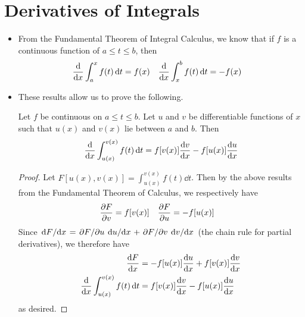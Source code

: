 \documentclass[../main.tex]{subfiles}
\begin{document}
\section{Derivatives of Integrals}
\begin{itemize}
    \item From the Fundamental Theorem of Integral Calculus, we know that if $f$ is a continuous function of $a\leq t\leq b$, then
    \begin{align*}
        \dv{x}\int_a^xf(t)\dd{t} &= f(x)&
            \dv{x}\int_x^bf(t)\dd{t} &= -f(x)
    \end{align*}
    \item These results allow us to prove the following.
    \begin{thm}
        Let $f$ be continuous on $a\leq t\leq b$. Let $u$ and $v$ be differentiable functions of $x$ such that $u(x)$ and $v(x)$ lie between $a$ and $b$. Then
        \begin{equation*}
            \dv{x}\int_{u(x)}^{v(x)}f(t)\dd{t} = f[v(x)]\dv{v}{x}-f[u(x)]\dv{u}{x}
        \end{equation*}
        \begin{proof}
            Let $F[u(x),v(x)]=\int_{u(x)}^{v(x)}f(t)\dd{t}$. Then by the above results from the Fundamental Theorem of Calculus, we respectively have
            \begin{align*}
                \pdv{F}{v} &= f[v(x)]&
                    \pdv{F}{u} &= -f[u(x)]
            \end{align*}
            Since $\dv*{F}{x}=\pdv*{F}{u}\dv*{u}{x}+\pdv*{F}{v}\dv*{v}{x}$ (the chain rule for partial derivatives), we therefore have
            \begin{align*}
                \dv{F}{x} &= -f[u(x)]\dv{u}{x}+f[v(x)]\dv{v}{x}\\
                \dv{x}\int_{u(x)}^{v(x)}f(t)\dd{t} &= f[v(x)]\dv{v}{x}-f[u(x)]\dv{u}{x}
            \end{align*}
            as desired.
        \end{proof}
    \end{thm}
\end{itemize}
\end{document}
